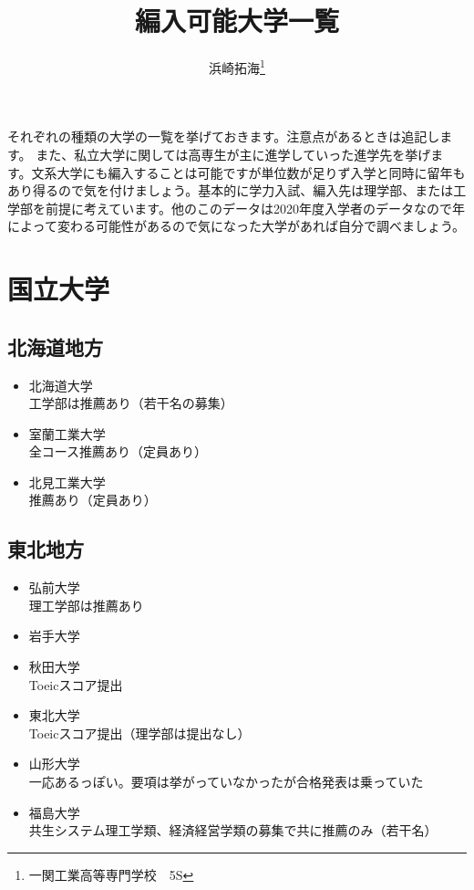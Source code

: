 \documentclass[platex, dvipdfmx, a4paper]{jarticle}
\title{編入可能大学一覧}
\author{浜崎拓海\thanks{一関工業高等専門学校　5S}}
\date{}
\begin{document}
    \maketitle
    \tableofcontents

    それぞれの種類の大学の一覧を挙げておきます。\cite{大学編入実施主要67:online}注意点があるときは追記します。
    また、私立大学に関しては高専生が主に進学\cite{gaiyou2016:online}していった進学先を挙げます。文系大学にも編入することは可能ですが単位数が足りず入学と同時に留年もあり得るので気を付けましょう。基本的に学力入試、編入先は理学部、または工学部を前提に考えています。他のこのデータは2020年度入学者のデータなので年によって変わる可能性があるので気になった大学があれば自分で調べましょう。
    \clearpage
    \section{国立大学}
      \subsection{北海道地方}
        \begin{itemize}
          \item 北海道大学
            \\工学部は推薦あり（若干名の募集）
          \item 室蘭工業大学
            \\全コース推薦あり（定員あり）
          \item 北見工業大学
            \\推薦あり（定員あり）
        \end{itemize}
      \subsection{東北地方}
        \begin{itemize}
          \item 弘前大学
            \\理工学部は推薦あり
          \item 岩手大学
          \item 秋田大学
            \\Toeicスコア提出
          \item 東北大学
            \\Toeicスコア提出（理学部は提出なし）
          \item 山形大学
            \\一応あるっぽい。要項は挙がっていなかったが合格発表は乗っていた
          \item 福島大学
            \\共生システム理工学類、経済経営学類の募集で共に推薦のみ（若干名）
        \end{itemize}
\end{document}

